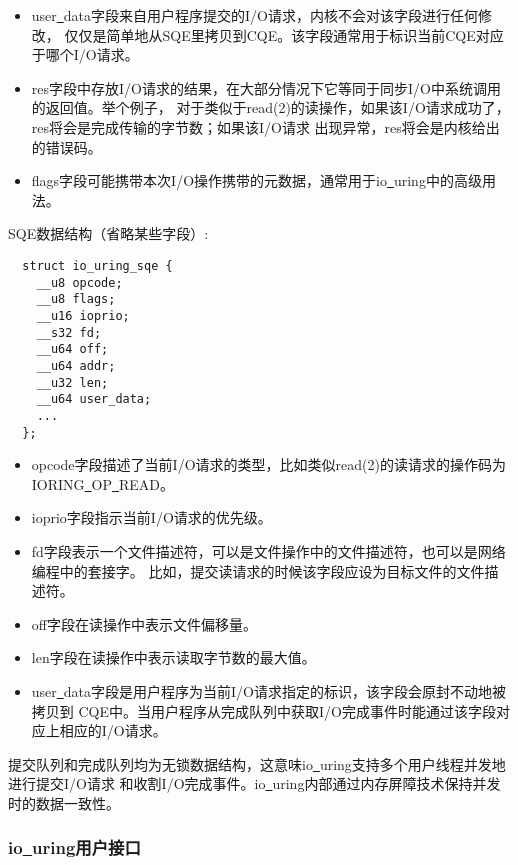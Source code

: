 \documentclass[supercite]{HustGraduPaper}
\theoremstyle{definition}
\begin{document}
\begin{itemize}
  \item user\underline{~}data字段来自用户程序提交的I/O请求，内核不会对该字段进行任何修改，
    仅仅是简单地从SQE里拷贝到CQE。该字段通常用于标识当前CQE对应于哪个I/O请求。
  \item res字段中存放I/O请求的结果，在大部分情况下它等同于同步I/O中系统调用的返回值。举个例子，
    对于类似于read(2)的读操作，如果该I/O请求成功了，res将会是完成传输的字节数；如果该I/O请求
    出现异常，res将会是内核给出的错误码。
  \item flags字段可能携带本次I/O操作携带的元数据，通常用于io\underline{~}uring中的高级用法。
\end{itemize}

SQE数据结构（省略某些字段）:

\begin{lstlisting}
  struct io_uring_sqe {
    __u8 opcode;
    __u8 flags;
    __u16 ioprio;
    __s32 fd;
    __u64 off;
    __u64 addr;
    __u32 len;
    __u64 user_data;
    ...
  };
\end{lstlisting}

\begin{itemize}
  \item opcode字段描述了当前I/O请求的类型，比如类似read(2)的读请求的操作码为
    IORING\underline{~}OP\underline{~}READ。
  \item ioprio字段指示当前I/O请求的优先级。
  \item fd字段表示一个文件描述符，可以是文件操作中的文件描述符，也可以是网络编程中的套接字。
    比如，提交读请求的时候该字段应设为目标文件的文件描述符。
  \item off字段在读操作中表示文件偏移量。
  \item len字段在读操作中表示读取字节数的最大值。
  \item user\underline{~}data字段是用户程序为当前I/O请求指定的标识，该字段会原封不动地被拷贝到
    CQE中。当用户程序从完成队列中获取I/O完成事件时能通过该字段对应上相应的I/O请求。
\end{itemize}

提交队列和完成队列均为无锁数据结构，这意味io\underline{~}uring支持多个用户线程并发地进行提交I/O请求
和收割I/O完成事件。io\underline{~}uring内部通过内存屏障技术保持并发时的数据一致性。\par

\subsubsection{io\underline{~}uring用户接口}
\end{document}
